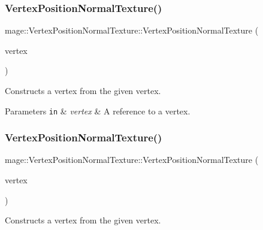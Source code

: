 \subsubsection{\texorpdfstring{Vertex\+Position\+Normal\+Texture()}{VertexPositionNormalTexture()}\hspace{0.1cm}{\footnotesize\ttfamily [3/4]}}
{\footnotesize\ttfamily mage\+::\+Vertex\+Position\+Normal\+Texture\+::\+Vertex\+Position\+Normal\+Texture (\begin{DoxyParamCaption}\item[{const \hyperlink{structmage_1_1_vertex_position_normal_texture}{Vertex\+Position\+Normal\+Texture} \&}]{vertex }\end{DoxyParamCaption})\hspace{0.3cm}{\ttfamily [default]}}

Constructs a vertex from the given vertex.


\begin{DoxyParams}[1]{Parameters}
\mbox{\tt in}  & {\em vertex} & A reference to a vertex. \\
\hline
\end{DoxyParams}
\hypertarget{structmage_1_1_vertex_position_normal_texture_addafeaefa77a932dd88e14bd14e0c7d0}{}\label{structmage_1_1_vertex_position_normal_texture_addafeaefa77a932dd88e14bd14e0c7d0} 
\subsubsection{\texorpdfstring{Vertex\+Position\+Normal\+Texture()}{VertexPositionNormalTexture()}\hspace{0.1cm}{\footnotesize\ttfamily [4/4]}}
{\footnotesize\ttfamily mage\+::\+Vertex\+Position\+Normal\+Texture\+::\+Vertex\+Position\+Normal\+Texture (\begin{DoxyParamCaption}\item[{\hyperlink{structmage_1_1_vertex_position_normal_texture}{Vertex\+Position\+Normal\+Texture} \&\&}]{vertex }\end{DoxyParamCaption})\hspace{0.3cm}{\ttfamily [default]}}

Constructs a vertex from the given vertex.


